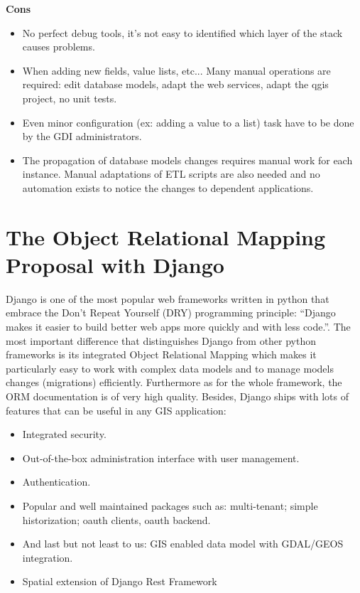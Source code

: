 \documentclass[runningheads]{llncs}
\begin{document}
\textbf{Cons} 
\begin{itemize}
	\item No perfect debug tools, it's not easy to identified which layer of the stack causes problems.
	\item When adding new fields, value lists, etc... Many manual operations are required: edit database models, adapt the web services, adapt the qgis project, no unit tests.
	\item Even minor configuration (ex: adding a value to a list) task have to be done by the GDI administrators.
	\item The propagation of database models changes requires manual work for each instance. Manual adaptations of ETL scripts are also needed and no automation exists to notice the changes to dependent applications.
\end{itemize}


\section{The Object Relational Mapping Proposal with Django}

Django is one of the most popular web frameworks written in python that embrace the Don’t Repeat Yourself (DRY) programming principle: “Django makes it easier to build better web apps more quickly and with less code.”. The most important difference that distinguishes Django from other python frameworks is its integrated Object Relational Mapping which makes it particularly easy to work with complex data models and to manage models changes (migrations) efficiently. Furthermore as for the whole framework, the ORM documentation is of very high quality. Besides, Django ships with lots of features that can be useful in any GIS application: 

\begin{itemize}
	\item Integrated security.
	\item Out-of-the-box administration interface with user management. 
	\item Authentication.
	\item Popular and well maintained packages such as: multi-tenant; simple historization; oauth clients, oauth backend.
	\item And last but not least to us: GIS enabled data model with GDAL/GEOS integration.
	\item Spatial extension of Django Rest Framework
\end{itemize}
\end{document}
